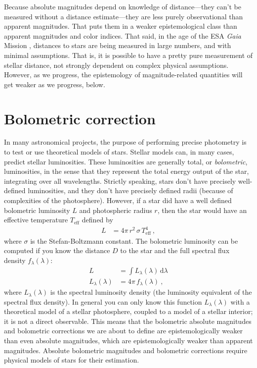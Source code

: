 \documentclass[10pt]{article}
\newcommand{\dd}{\mathrm{d}}
\newcommand{\eff}{\text{eff}}
\begin{document}
Because absolute magnitudes depend on knowledge of distance---they can't be measured without a distance estimate---they are less purely observational than apparent magnitudes.
That puts them in a weaker epistemological class than apparent magnitudes and color indices.
That said, in the age of the ESA \textsl{Gaia} Mission \cite{gaia}, distances to stars are being measured in large numbers, and with minimal assumptions.
That is, it is possible to have a pretty pure measurement of stellar distance, not strongly dependent on complex physical assumptions.
However, as we progress, the epistemology of magnitude-related quantities will get weaker as we progress, below.

\section{Bolometric correction}\label{sec:bc}

In many astronomical projects, the purpose of performing precise photometry is to test or use theoretical models of stars.
Stellar models can, in many cases, predict stellar luminosities.
These luminosities are generally total, or \emph{bolometric}, luminosities, in the sense that they represent the total energy output of the star, integrating over all wavelengths.
Strictly speaking, stars don't have precisely well-defined luminosities, and they don't have precisely defined radii (because of complexities of the photosphere).
However, if a star did have a well defined bolometric luminosity $L$ and photospheric radius $r$, then the star would have an effective temperature $T_\eff$ defined by
\begin{align}
    L &= 4\pi\,r^2\,\sigma\,T_\eff^4 ~,
\end{align}
where $\sigma$ is the Stefan-Boltzmann constant.
The bolometric luminosity can be computed if you know the distance $D$ to the star and the full spectral flux density $f_\lambda(\lambda)$:
\begin{align}
    L &= \int L_\lambda(\lambda)\,\dd\lambda\label{eq:L}\\
    L_\lambda(\lambda) &= 4\pi\,f_\lambda(\lambda)\label{eq:L_lambda}~,
\end{align}
where $L_\lambda(\lambda)$ is the spectral luminosity density (the luminosity equivalent of the spectral flux density).
In general you can only know this function $L_\lambda(\lambda)$ with a theoretical model of a stellar photosphere, coupled to a model of a stellar interior; it is not a direct observable.
This means that the bolometric absolute magnitudes and bolometric corrections we are about to define are epistemologically weaker than even absolute magnitudes, which are epistemologically weaker than apparent magnitudes.
Absolute bolometric magnitudes and bolometric corrections require physical models of stars for their estimation.
\end{document}
